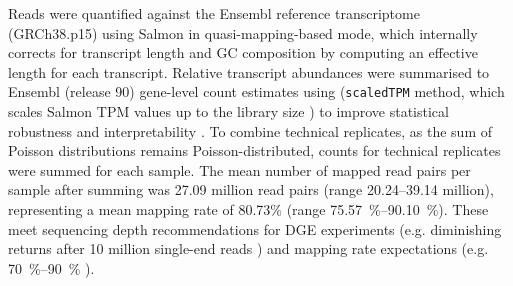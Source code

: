Reads were quantified against the Ensembl reference transcriptome (GRCh38.p15) using Salmon \autocite{patro2017SalmonProvidesFast} in quasi-mapping-based mode, 
which internally corrects for transcript length and GC composition by computing an effective length for each transcript.
%
Relative transcript abundances were summarised to Ensembl (release 90) gene-level count estimates using  (\texttt{scaledTPM} method, which scales Salmon \gls{TPM} values up to the library size \autocite{soneson2016DifferentialAnalysesRNAseq,love2018SwimmingDownstreamStatistical}) to improve statistical robustness and interpretability \autocite{soneson2016DifferentialAnalysesRNAseq}.
To combine technical replicates, as the sum of Poisson distributions remains Poisson-distributed, counts for technical replicates were summed for each sample.
The mean number of mapped read pairs per sample after summing was 27.09 million read pairs (range \numrange{20.24}{39.14} million), representing a mean mapping rate of 80.73\% (range \SIrange{75.57}{90.10}{\percent}).
These meet sequencing depth recommendations for \gls{DGE} experiments
(e.g. diminishing returns after 10 million single-end reads \autocite{liu2014RNAseqDifferentialExpression}) 
and mapping rate expectations 
(e.g. \SIrange{70}{90}{\percent} \autocite{conesa2016SurveyBestPractices}).
%
%
